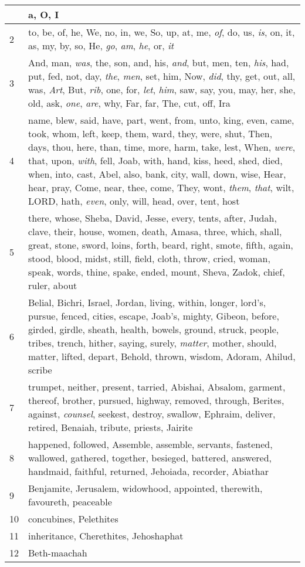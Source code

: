 \begin{longtable}{l|p{3.75in}}
\hline \hline
\endlastfoot
1 & a, O, I \\ \hline
2 & to, be, of, he, We, no, in, we, So, up, at, me, \emph{of}, do, us, \emph{is}, on, it, as, my, by, so, He, \emph{go}, \emph{am}, \emph{he}, or, \emph{it} \\ \hline
3 & And, man, \emph{was}, the, son, and, his, \emph{and}, but, men, ten, \emph{his}, had, put, fed, not, day, \emph{the}, \emph{men}, set, him, Now, \emph{did}, thy, get, out, all, was, \emph{Art}, But, \emph{rib}, one, for, \emph{let}, \emph{him}, saw, say, you, may, her, she, old, ask, \emph{one}, \emph{are}, why, Far, far, The, cut, off, Ira \\ \hline
4 & name, blew, said, have, part, went, from, unto, king, even, came, took, whom, left, keep, them, ward, they, were, shut, Then, days, thou, here, than, time, more, harm, take, lest, When, \emph{were}, that, upon, \emph{with}, fell, Joab, with, hand, kiss, heed, shed, died, when, into, cast, Abel, also, bank, city, wall, down, wise, Hear, hear, pray, Come, near, thee, come, They, wont, \emph{them}, \emph{that}, wilt, LORD, hath, \emph{even}, only, will, head, over, tent, host \\ \hline
5 & there, whose, Sheba, David, Jesse, every, tents, after, Judah, clave, their, house, women, death, Amasa, three, which, shall, great, stone, sword, loins, forth, beard, right, smote, fifth, again, stood, blood, midst, still, field, cloth, throw, cried, woman, speak, words, thine, spake, ended, mount, Sheva, Zadok, chief, ruler, about \\ \hline
6 & Belial, Bichri, Israel, Jordan, living, within, longer, lord's, pursue, fenced, cities, escape, Joab's, mighty, Gibeon, before, girded, girdle, sheath, health, bowels, ground, struck, people, tribes, trench, hither, saying, surely, \emph{matter}, mother, should, matter, lifted, depart, Behold, thrown, wisdom, Adoram, Ahilud, scribe \\ \hline
7 & trumpet, neither, present, tarried, Abishai, Absalom, garment, thereof, brother, pursued, highway, removed, through, Berites, against, \emph{counsel}, seekest, destroy, swallow, Ephraim, deliver, retired, Benaiah, tribute, priests, Jairite \\ \hline
8 & happened, followed, Assemble, assemble, servants, fastened, wallowed, gathered, together, besieged, battered, answered, handmaid, faithful, returned, Jehoiada, recorder, Abiathar \\ \hline
9 & Benjamite, Jerusalem, widowhood, appointed, therewith, favoureth, peaceable \\ \hline
10 & concubines, Pelethites \\ \hline
11 & inheritance, Cherethites, Jehoshaphat \\ \hline
12 & Beth-maachah \\ \hline
\end{longtable}






